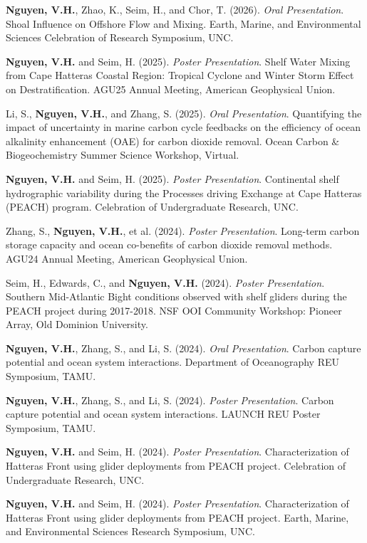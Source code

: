 \documentclass[letterpaper,MMMyyyy,nonstopmode]{simpleresumecv}
\begin{document}
\begin{Body}
\Entry
\textbf{Nguyen, V.H.}, Zhao, K., Seim, H., and Chor, T. (2026). \textit{Oral Presentation}. Shoal Influence on Offshore Flow and Mixing. Earth, Marine, and Environmental Sciences Celebration of Research Symposium, UNC.

\Gap
\Entry
\textbf{Nguyen, V.H.} and Seim, H. (2025). \textit{Poster Presentation}. Shelf Water Mixing from Cape Hatteras Coastal Region: Tropical Cyclone and Winter Storm Effect on Destratification. AGU25 Annual Meeting, American Geophysical Union.

\Gap
\Entry
Li, S., \textbf{Nguyen, V.H.}, and Zhang, S. (2025). \textit{Oral Presentation}. Quantifying the impact of uncertainty in marine carbon cycle feedbacks on the efficiency of ocean alkalinity enhancement (OAE) for carbon dioxide removal. Ocean Carbon \& Biogeochemistry Summer Science Workshop, Virtual.

\Gap
\Entry
\textbf{Nguyen, V.H.} and Seim, H. (2025). \textit{Poster Presentation}. Continental shelf hydrographic variability during the Processes driving Exchange at Cape Hatteras (PEACH) program. Celebration of Undergraduate Research, UNC.

\Gap
\Entry
Zhang, S., \textbf{Nguyen, V.H.}, et al. (2024). \textit{Poster Presentation}. Long-term carbon storage capacity and ocean co-benefits of carbon dioxide removal methods. AGU24 Annual Meeting, American Geophysical Union.

\Gap
\Entry
Seim, H., Edwards, C., and \textbf{Nguyen, V.H.} (2024). \textit{Poster Presentation}. Southern Mid-Atlantic Bight conditions observed with shelf gliders during the PEACH project during 2017-2018. NSF OOI Community Workshop: Pioneer Array, Old Dominion University.

\Gap
\Entry
\textbf{Nguyen, V.H.}, Zhang, S., and Li, S. (2024). \textit{Oral Presentation}. Carbon capture potential and ocean system interactions. Department of Oceanography REU Symposium, TAMU.

\Gap
\Entry
\textbf{Nguyen, V.H.}, Zhang, S., and Li, S. (2024). \textit{Poster Presentation}. Carbon capture potential and ocean system interactions. LAUNCH REU Poster Symposium, TAMU.

\Gap
\Entry
\textbf{Nguyen, V.H.} and Seim, H. (2024). \textit{Poster Presentation}. Characterization of Hatteras Front using glider deployments from PEACH project. Celebration of Undergraduate Research, UNC.

\Gap
\Entry
\textbf{Nguyen, V.H.} and Seim, H. (2024). \textit{Poster Presentation}. Characterization of Hatteras Front using glider deployments from PEACH project. Earth, Marine, and Environmental Sciences Research Symposium, UNC.



\end{Body}
\end{document}
